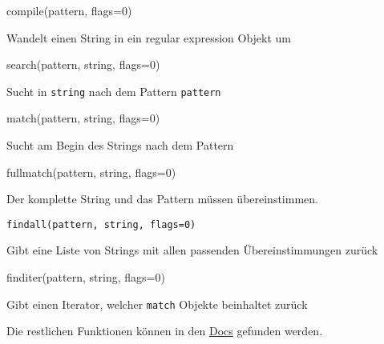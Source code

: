 \documentclass[ignorenonframetext,]{beamer}
\newenvironment{Shaded}{}{}
\newcommand{\DecValTok}[1]{\textcolor[rgb]{0.25,0.63,0.44}{{#1}}}
\newcommand{\OperatorTok}[1]{\textcolor[rgb]{0.40,0.40,0.40}{{#1}}}
\newcommand{\BuiltInTok}[1]{{#1}}
\newcommand{\NormalTok}[1]{{#1}}
\begin{document}
\begin{frame}[fragile]

\begin{Shaded}
\begin{Highlighting}[]
\BuiltInTok{compile}\NormalTok{(pattern, flags}\OperatorTok{=}\DecValTok{0}\NormalTok{)}
\end{Highlighting}
\end{Shaded}

Wandelt einen String in ein regular expression Objekt um

\begin{Shaded}
\begin{Highlighting}[]
\NormalTok{search(pattern, string, flags}\OperatorTok{=}\DecValTok{0}\NormalTok{)}
\end{Highlighting}
\end{Shaded}

Sucht in \texttt{string} nach dem Pattern \texttt{pattern}

\begin{Shaded}
\begin{Highlighting}[]
\NormalTok{match(pattern, string, flags}\OperatorTok{=}\DecValTok{0}\NormalTok{)}
\end{Highlighting}
\end{Shaded}

Sucht am Begin des Strings nach dem Pattern

\begin{Shaded}
\begin{Highlighting}[]
\NormalTok{fullmatch(pattern, string, flags}\OperatorTok{=}\DecValTok{0}\NormalTok{)}
\end{Highlighting}
\end{Shaded}

Der komplette String und das Pattern müssen übereinstimmen.

\end{frame}

\begin{frame}[fragile]

\begin{verbatim}
findall(pattern, string, flags=0)
\end{verbatim}

Gibt eine Liste von Strings mit allen passenden Übereinstimmungen zurück

\begin{Shaded}
\begin{Highlighting}[]
\NormalTok{finditer(pattern, string, flags}\OperatorTok{=}\DecValTok{0}\NormalTok{)}
\end{Highlighting}
\end{Shaded}

Gibt einen Iterator, welcher \texttt{match} Objekte beinhaltet zurück

Die restlichen Funktionen können in den
\href{https://docs.python.org/3/library/re.html}{Docs} gefunden werden.

\end{frame}
\end{document}

